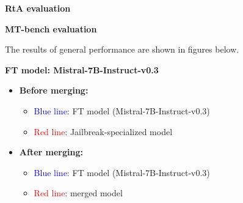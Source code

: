 \documentclass[conference,compsoc]{IEEEtran}
\begin{document}
\textbf{RtA evaluation}
\begin{table}[h]
\centering
\caption{RtA Evaluation\\Base model: Mistral-7B-v0.3}
\label{tab:rta_combined_e12}
\end{table}


\leavevmode\par
\textbf{MT-bench evaluation}

The results of general performance are shown in figures below.

\textbf{FT model: Mistral-7B-Instruct-v0.3}
\begin{itemize}
    \item \textbf{Before merging:}
    \begin{itemize}
        \item \textcolor{blue}{Blue line}: FT model (Mistral-7B-Instruct-v0.3)
        \item \textcolor{red}{Red line}: Jailbreak-specialized model
    \end{itemize}
    \item \textbf{After merging:}
    \begin{itemize}
        \item \textcolor{blue}{Blue line}: FT model (Mistral-7B-Instruct-v0.3)
        \item \textcolor{red}{Red line}: merged model
    \end{itemize}
\end{itemize}

\end{document}

